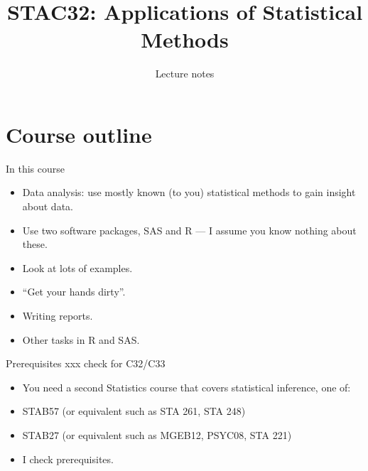 \documentclass[ignorenonframetext,]{beamer}
\title{STAC32: Applications of Statistical Methods}
\author{Lecture notes}
\date{}
\providecommand{\tightlist}{%
  \setlength{\itemsep}{0pt}\setlength{\parskip}{0pt}}
\begin{document}
\frame{\titlepage}

\hypertarget{course-outline}{%
\section{Course outline}\label{course-outline}}

\begin{frame}{In this course}
\protect\hypertarget{in-this-course}{}

\begin{itemize}
\tightlist
\item
  Data analysis: use mostly known (to you) statistical methods to gain
  insight about data.
\item
  Use two software packages, SAS and R --- I assume you know nothing
  about these.
\item
  Look at lots of examples.
\item
  ``Get your hands dirty''.
\item
  Writing reports.
\item
  Other tasks in R and SAS.
\end{itemize}

\end{frame}

\begin{frame}{Prerequisites xxx check for C32/C33}
\protect\hypertarget{prerequisites-xxx-check-for-c32c33}{}

\begin{itemize}
\tightlist
\item
  You need a second Statistics course that covers statistical inference,
  one of:
\item
  STAB57 (or equivalent such as STA 261, STA 248)
\item
  STAB27 (or equivalent such as MGEB12, PSYC08, STA 221)
\item
  I check prerequisites.
\end{itemize}

\end{frame}
\end{document}
